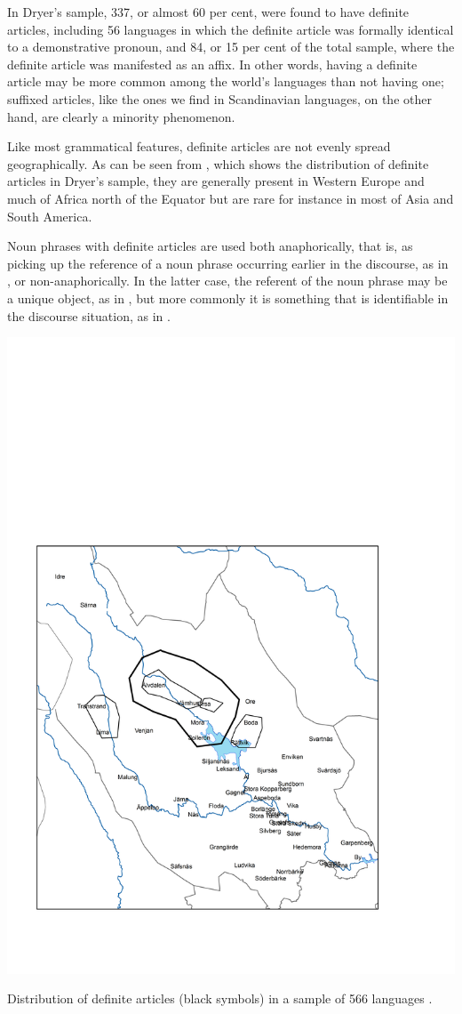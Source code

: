 In Dryer’s sample, 337, or almost 60 per cent, were found to have definite articles, including 56 languages in which the definite article was formally identical to a demonstrative pronoun, and 84, or 15 per cent of the total sample, where the definite article was manifested as an affix. In other words, having a definite article may be more common among the world’s languages than not having one; suffixed articles, like the ones we find in Scandinavian languages, on the other hand, are clearly a minority phenomenon. 

Like most grammatical features, definite articles are not evenly spread geographically. As can be seen from , which shows the distribution of definite articles in Dryer’s sample, they are generally present in Western Europe and much of Africa north of the Equator but are rare for instance in most of Asia and South America.

Noun phrases with definite articles are used both anaphorically, that is, as picking up the reference of a noun phrase occurring earlier in the discourse, as in , or non-anaphorically. In the latter case, the referent of the noun phrase may be a unique object, as in , but more commonly it is something that is identifiable in the discourse situation, as in .

\includegraphics{figures_mod/image8}
\caption{Distribution of definite articles (black symbols) in a sample of 566 languages \citep{Dryer2005}.}
\label{map:8}

